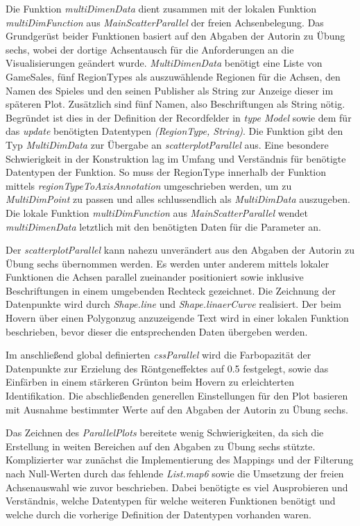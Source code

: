 \documentclass[usegeometry=true]{scrartcl}
\begin{document}
Die Funktion \textit{multiDimenData} dient zusammen mit der lokalen Funktion \textit{multiDimFunction} aus \textit{MainScatterParallel} 
der freien Achsenbelegung.
Das Grundgerüst beider Funktionen basiert auf den Abgaben der Autorin zu Übung sechs, 
wobei der dortige Achsentausch für die Anforderungen an die Visualisierungen geändert wurde. 
\textit{MultiDimenData} benötigt eine Liste von GameSales, fünf RegionTypes als auszuwählende Regionen für die Achsen, 
den Namen des Spieles und den seinen Publisher als String zur Anzeige dieser im späteren Plot. 
Zusätzlich sind fünf Namen, also Beschriftungen als String nötig. 
Begründet ist dies in der Definition der Recordfelder in \textit{type Model} sowie dem für das \textit{update} benötigten Datentypen 
\textit{(RegionType, String)}.
Die Funktion gibt den Typ \textit{MultiDimData} zur Übergabe an \textit{scatterplotParallel} aus. 
Eine besondere Schwierigkeit in der Konstruktion lag im Umfang und Verständnis für benötigte Datentypen der Funktion. 
So muss der RegionType innerhalb der Funktion mittels \textit{regionTypeToAxisAnnotation} umgeschrieben werden, 
um zu \textit{MultiDimPoint} zu passen und alles schlussendlich als \textit{MultiDimData} auszugeben. 
Die lokale Funktion \textit{multiDimFunction} aus \textit{MainScatterParallel} wendet \textit{multiDimenData} 
letztlich mit den benötigten Daten für die Parameter an.

Der \textit{scatterplotParallel} kann nahezu unverändert aus den Abgaben der Autorin zu Übung sechs übernommen werden. 
Es werden unter anderem mittels lokaler Funktionen die Achsen parallel zueinander positioniert sowie inklusive Beschriftungen in einem umgebenden Rechteck gezeichnet.
Die Zeichnung der Datenpunkte wird durch \textit{Shape.line} und \textit{Shape.linaerCurve} realisiert.
Der beim Hovern über einen Polygonzug anzuzeigende Text wird in einer lokalen Funktion beschrieben, bevor dieser die entsprechenden Daten übergeben werden.

Im anschließend global definierten \textit{cssParallel} wird die Farbopazität der Datenpunkte zur Erzielung des Röntgeneffektes auf 0.5 festgelegt, 
sowie das Einfärben in einem stärkeren Grünton beim Hovern zu erleichterten Identifikation. 
Die abschließenden generellen Einstellungen für den Plot basieren mit Ausnahme bestimmter Werte auf den Abgaben der Autorin zu Übung sechs. 
 
Das Zeichnen des \textit{ParallelPlots} bereitete wenig Schwierigkeiten, da sich die Erstellung in weiten Bereichen auf den Abgaben zu Übung sechs stützte.
Komplizierter war zunächst die Implementierung des Mappings und der Filterung nach Null-Werten durch das fehlende \textit{List.map6} 
sowie die Umsetzung der freien Achsenauswahl wie zuvor beschrieben. 
Dabei benötigte es viel Ausprobieren und Verständnis, welche Datentypen für welche weiteren Funktionen benötigt 
und welche durch die vorherige Definition der Datentypen vorhanden waren.
\end{document}
